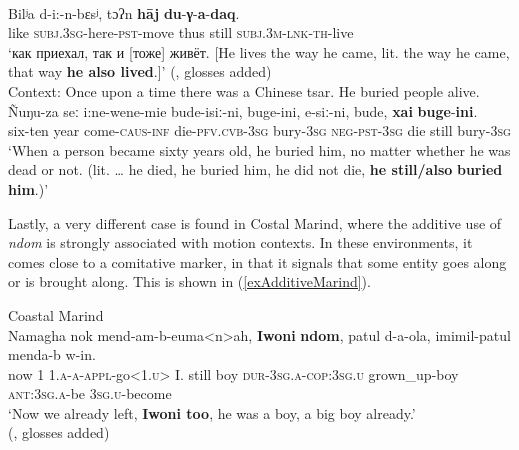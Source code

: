 \begin{exe}
	\ex {}\label{exAdditiveEquative}\\
	\gll Bilʲa d-i:-n-bεsʲ, tɔʔn \textbf{hāj} \textbf{du}-\textbf{γ}-\textbf{a}-\textbf{daq}.\\
	like \textsc{subj}.3\textsc{sg}-here-\textsc{pst}-move thus still \textsc{subj}.3\textsc{m}-\textsc{lnk}-\textsc{th}-live\\
	\glt \lq как приехал, так и [тоже] живёт. [He lives the way he came, lit. the way he came, that way \textbf{he also lived}.]\rq{ }(\cite[177]{KotorovaNefedov2015}, glosses added)
	\ex {}\label{exAdditiveUdiheConcessive}\\
	Context: Once upon a time there was a Chinese tsar. He buried people alive.\\
	\gll Ñuŋu-za seː i:ne-wene-mie bude-isiː-ni, buge-ini, e-siː-ni, bude, \textbf{xai} \textbf{buge}-\textbf{ini}.\\
	six-ten year come-\textsc{caus}-\textsc{inf} die-\textsc{pfv}.\textsc{cvb}-3\textsc{sg} bury-3\textsc{sg} \textsc{neg}-\textsc{pst}-3\textsc{sg} die still bury-3\textsc{sg}\\
	\glt \lq When a person became sixty years old, he buried him, no matter whether he was dead or not. (lit. … he died, he buried him, he did not die, \textbf{he still}\textbf{/}\textbf{also} \textbf{buried} \textbf{him}.)' \parencite[18–20]{NikolaevaEtAl2003}
\end{exe}	
	
Lastly, a very different case is found in Costal Marind, where the additive use of \textit{ndom} is strongly associated with motion contexts. In these environments, it comes close to a comitative marker, in that it signals that some entity goes along or is brought along. This is shown in (\ref{exAdditiveMarind}).\largerpage

\begin{exe}
	\ex Coastal Marind\label{exAdditiveMarind}\\
	\gll Namagha nok mend-am-b-euma<n>ah, \textbf{Iwoni} \textbf{ndom}, patul d-a-ola, imimil-patul menda-b w-in.\\
	now 1 1.\textsc{a}-\textsc{a}-\textsc{appl}-go<1.\textsc{u}> I. still boy \textsc{dur}-3\textsc{sg}.\textsc{a}-\textsc{cop}:3\textsc{sg}.\textsc{u} grown\_up-boy \textsc{ant}:3\textsc{sg}.\textsc{a}-be 3\textsc{sg}.\textsc{u}-become\\
	\glt \lq Now we already left, \textbf{Iwoni too}, he was a boy, a big boy already.'
	\\(\cite{Olsson2015},  glosses added)	
\end{exe}

